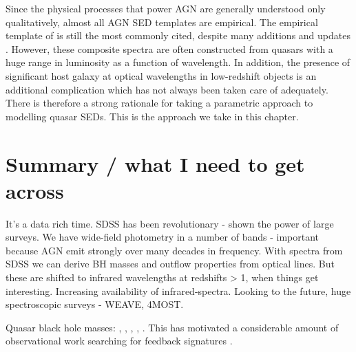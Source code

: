 Since the physical processes that power \ac{AGN} are generally understood only qualitatively, almost all \ac{AGN} \ac{SED} templates are empirical. 
The empirical template of \citet{elvis94} is still the most commonly cited, despite many additions and updates \citep[e.g.][]{polletta00, kuraszkiewicz03, risaliti04, richards06,  polletta07, lusso10, shang11, marchese12, trichas12}. 
However, these composite spectra are often constructed from quasars with a huge range in luminosity as a function of wavelength. 
In addition, the presence of significant host galaxy at optical wavelengths in low-redshift objects is an additional complication which has not always been taken care of adequately. 
There is therefore a strong rationale for taking a parametric approach to modelling quasar \ac{SED}s. 
This is the approach we take in this chapter. 


\section{Summary / what I need to get across}

It's a data rich time.
SDSS has been revolutionary - shown the power of large surveys. 
We have wide-field photometry in a number of bands - important because AGN emit strongly over many decades in frequency. 
With spectra from SDSS we can derive BH masses and outflow properties from optical lines. 
But these are shifted to infrared wavelengths at redshifts > 1, when things get interesting. 
Increasing availability of infrared-spectra. 
Looking to the future, huge spectroscopic surveys - WEAVE, 4MOST. 

Quasar black hole masses: \citet{shen13}, \citet{peterson10}, \citet{peterson11}, \citet{vestergaard11}, \citet{marziani12}. 
This has motivated a considerable amount of observational work searching for feedback signatures \citep[for recent reviews, see][]{alexander12,fabian12,heckman14}. 
